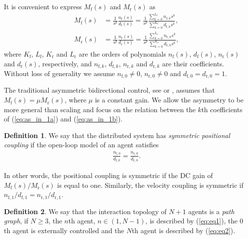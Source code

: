 \documentclass[10pt,twocolumn,twoside]{IEEEtran}
\theoremstyle{definition}
\newtheorem{defn}{Definition}
\newcommand{\revA}{Black}
\begin{document}
It is convenient to express $M_{\text{f}}(s)$ and $M_{\text{r}}(s)$ as
\begin{align}
  M_{\text{f}}(s) &= \frac{1}{s^p} \frac{n_{\text{f}}(s)}{d_{\text{f}}(s)} = \frac{1}{s^p} \frac{\sum_{k=0}^{L_{\text{f}}}n_{\text{f},k} s^k}{\sum_{k=0}^{K_{\text{f}}} d_{\text{f},k}s^k},\label{eq:as_in_1a} \\
  M_{\text{r}}(s) &= \frac{1}{s^p} \frac{n_{\text{r}}(s)}{d_{\text{r}}(s)} = \frac{1}{s^p} \frac{\sum_{k=0}^{L_{\text{r}}}n_{\text{r},k} s^k}{\sum_{k=0}^{K_{\text{r}}}d_{\text{r},k}s^k},\label{eq:as_in_1b}
\end{align}
where $K_{\text{f}}$, $L_{\text{f}}$, $K_{\text{r}}$ and $L_{\text{r}}$ are the orders of polynomials $n_{\text{f}}(s)$, $d_{\text{f}}(s)$, $n_{\text{r}}(s)$ and $d_{\text{r}}(s)$, respectively, and $n_{\text{f},k}$, $d_{\text{f},k}$, $n_{\text{r},k}$ and $d_{\text{r},k}$ are their coefficients. Without loss of generality we assume $n_{\text{f},0} \neq 0$, $n_{\text{r},0} \neq 0$ and $d_{\text{f},0} = d_{\text{r},0} = 1$.




The traditional asymmetric bidirectional control, see \cite{Barooah2009} or \cite{Tangerman2012}, assumes that $M_{\text{f}}(s) = \mu M_{\text{r}}(s)$, where $\mu$ is a constant gain. We allow the asymmetry to be more general than scaling and focus on the relation between the $k$th coefficients of (\ref{eq:as_in_1a}) and (\ref{eq:as_in_1b}). 

\begin{defn}\label{def:pos_coupling}
We say that the distributed system has \emph{symmetric positional coupling} if the open-loop model of an agent satisfies
  \begin{align}
  \frac{n_{\text{f},0}}{d_{\text{f},0}} = \frac{n_{\text{r},0}}{d_{\text{r},0}}.
  \end{align}
\end{defn}
In other words, the positional coupling is symmetric if the DC gain of $M_{\text{f}}(s)/M_{\text{r}}(s)$ is equal to one. Similarly, the velocity coupling is symmetric if $n_{\text{f},1}/d_{\text{f},1} = n_{\text{r},1}/d_{\text{r},1}$.

\begin{defn}\label{def:path_graph}
{\color{\revA}
We say that the interaction topology of $N+1$ agents is a \emph{path graph}, if $N \geq 3$, the $n$th agent, $n \in (1,N-1)$, is described by (\ref{eq:eq1}), the $0$th agent is externally controlled and the $N$th agent is described by (\ref{eq:eq2}).}
\end{defn}
\end{document}
